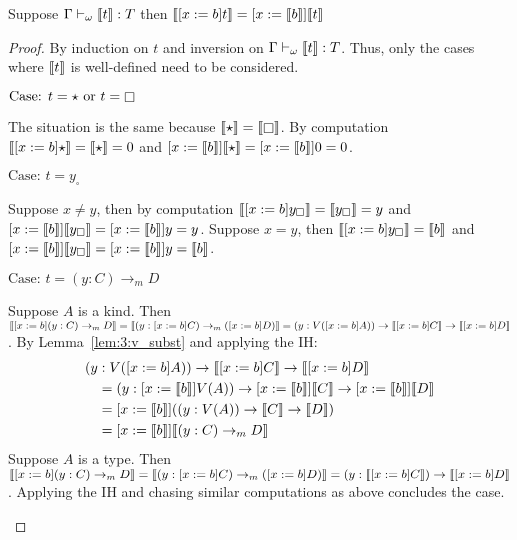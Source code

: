 \begin{lemma}
    \label{lem:3:sema_subst}
    Suppose $\Gamma \vdash_\omega \llbracket t \rrbracket : T$ then $\llbracket [x := b]t \rrbracket = [x := \llbracket b \rrbracket]\llbracket t \rrbracket$
\end{lemma}
\begin{proof}
    By induction on $t$ and inversion on $\Gamma \vdash_\omega \llbracket t \rrbracket : T$.
    Thus, only the cases where $\llbracket t \rrbracket$ is well-defined need to be considered.

    $\text{Case: } t = \star \text{ or } t = \kind$
    \begin{proofcase}
        The situation is the same because $\sema{\star} = \sema{\kind}$.
        By computation $\llbracket [x := b]\star \rrbracket = \llbracket \star \rrbracket = 0$ and $[x := \llbracket b \rrbracket]\llbracket \star \rrbracket = [x := \llbracket b \rrbracket]0 = 0$.
    \end{proofcase}

    $\text{Case: } t = y_\square$
    \begin{proofcase}
        Suppose $x \neq y$, then by computation $\llbracket [x := b]y_\square \rrbracket = \llbracket y_\square \rrbracket = y$ and $[x := \llbracket b \rrbracket]\llbracket y_\square \rrbracket = [x := \llbracket b \rrbracket]y = y$.
        Suppose $x = y$, then $\llbracket [x := b]y_\square \rrbracket = \llbracket b \rrbracket$ and $[x := \llbracket b \rrbracket]\llbracket y_\square \rrbracket = [x := \llbracket b \rrbracket]y = \llbracket b \rrbracket$.
    \end{proofcase}

    $\text{Case: } t = (y : C) \to_m D$
    \begin{proofcase}
        Suppose $A$ is a kind.
        Then $\llbracket [x := b](y : C) \to_m D \rrbracket = \llbracket (y : [x := b]C) \to_m ([x := b]D) \rrbracket = (y : V([x := b]A)) \to \llbracket [x := b]C \rrbracket \to \llbracket [x := b]D \rrbracket$.
        By Lemma~\ref{lem:3:v_subst} and applying the IH:
        \begin{align*}
            (y &: V([x := b]A)) \to \llbracket [x := b]C \rrbracket \to \llbracket [x := b]D \rrbracket \\
            &= (y : [x := \llbracket b \rrbracket]V(A)) \to [x := \llbracket b \rrbracket]\llbracket C \rrbracket \to [x := \llbracket b \rrbracket]\llbracket D \rrbracket \\
            &= [x := \llbracket b \rrbracket]((y : V(A)) \to \llbracket C \rrbracket \to \llbracket D \rrbracket) \\
            &= [x := \llbracket b \rrbracket]\llbracket (y : C) \to_m D \rrbracket
        \end{align*}
        Suppose $A$ is a type.
        Then $\llbracket [x := b](y : C) \to_m D \rrbracket = \llbracket (y : [x := b]C) \to_m ([x := b]D) \rrbracket = (y : \llbracket [x := b]C \rrbracket) \to \llbracket [x := b]D \rrbracket$.
        Applying the IH and chasing similar computations as above concludes the case.
    \end{proofcase}


\end{proof}
